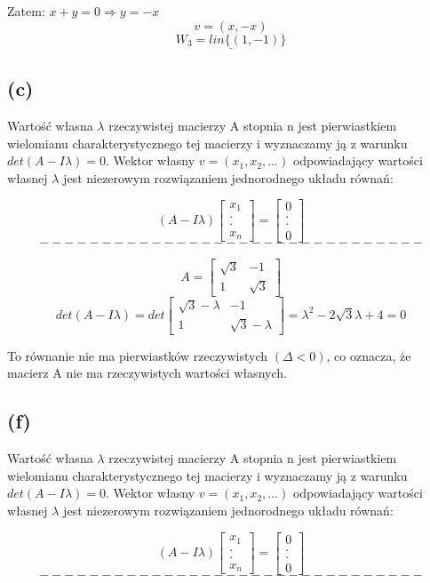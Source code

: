 \documentclass{article}
\begin{document}
Zatem: $x+y=0 \Rightarrow y=-x$
$$v = (x,-x)$$
$$\underline{W_3 = lin\{(1,-1)\}}$$


\subsection{(c)}

Wartość własna $\lambda$ rzeczywistej macierzy A stopnia n jest pierwiastkiem wielomianu charakterystycznego tej macierzy i wyznaczamy ją z warunku $det(A-I\lambda) = 0$. Wektor własny $v = (x_1,x_2,...)$ odpowiadający wartości własnej $\lambda$ jest niezerowym rozwiązaniem jednorodnego układu równań:

$$(A-I\lambda)\left[\begin{array}{c}x_1\\.\\.\\x_n\end{array}\right] = \left[\begin{array}{c}0\\.\\.\\0\end{array}\right]$$
$$-------------------------------$$

$$A = \left[\begin{array}{cc}\sqrt{3}&-1\\1&\sqrt{3}\end{array}\right]$$
$$det(A-I\lambda) = det \left[\begin{array}{cc}\sqrt{3}-\lambda & -1\\1 & \sqrt{3}-\lambda\end{array}\right] = \lambda^2 -2\sqrt{3}\lambda + 4 = 0$$ \newline

To równanie nie ma pierwiastków rzeczywistych $(\Delta<0)$, co oznacza, że macierz A nie ma rzeczywistych wartości własnych.


\subsection{(f)}

Wartość własna $\lambda$ rzeczywistej macierzy A stopnia n jest pierwiastkiem wielomianu charakterystycznego tej macierzy i wyznaczamy ją z warunku $det(A-I\lambda) = 0$. Wektor własny $v = (x_1,x_2,...)$ odpowiadający wartości własnej $\lambda$ jest niezerowym rozwiązaniem jednorodnego układu równań:

$$(A-I\lambda)\left[\begin{array}{c}x_1\\.\\.\\x_n\end{array}\right] = \left[\begin{array}{c}0\\.\\.\\0\end{array}\right]$$
$$-------------------------------$$
\end{document}
